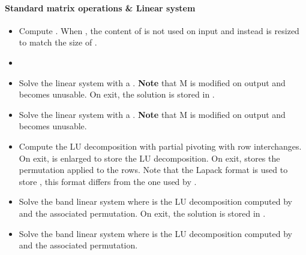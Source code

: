 \paragraph{Standard matrix operations \& Linear system}
\begin{itemize}
\item {} 
  \sshortdescribe Compute . When , the
  content of  is not used on input and instead  is resized to
  match the size of .
\item {}
  \sshortdescribe {}
\item 
    \sshortdescribe Solve the linear system  with  a \PnlBandMat.
  {\bf Note} that M is modified on output and becomes unusable. On exit, the
  solution  is stored in .
\item 
    \sshortdescribe Solve the linear system  with  a \PnlBandMat.
  {\bf Note} that M is modified on output and becomes unusable. 
\item {}
  \sshortdescribe Compute the LU decomposition with partial pivoting with row
  interchanges. On exit,  is enlarged to store the LU decomposition. On
  exit,  stores the permutation applied to the rows. Note that the Lapack format
  is used to store , this format differs from the one used by
  \PnlPermutation.
\item  {} 
  \sshortdescribe Solve the band linear system  where  is
  the LU decomposition computed by   and  the
  associated permutation. On exit, the solution  is stored in .
\item  {} 
  \sshortdescribe Solve the band linear system  where  is the LU
  decomposition computed by  and  the associated permutation. 
\end{itemize}


